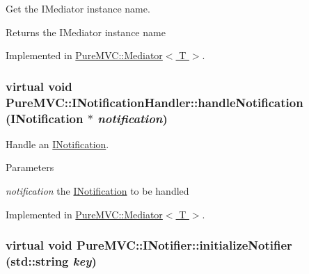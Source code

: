 Get the {\ttfamily IMediator} instance name. \begin{DoxyReturn}{Returns}
the {\ttfamily IMediator} instance name 
\end{DoxyReturn}


Implemented in \hyperlink{class_pure_m_v_c_1_1_mediator_aa199b499fc1cfae9b49b8336679787a8}{PureMVC::Mediator$<$ T $>$}.\hypertarget{class_pure_m_v_c_1_1_i_notification_handler_af31efbe0929caff0ac371bf45d3e9c50}{
\subsubsection[{handleNotification}]{\setlength{\rightskip}{0pt plus 5cm}virtual void PureMVC::INotificationHandler::handleNotification ({\bf INotification} $\ast$ {\em notification})}}
\label{class_pure_m_v_c_1_1_i_notification_handler_af31efbe0929caff0ac371bf45d3e9c50}


Handle an {\ttfamily \hyperlink{class_pure_m_v_c_1_1_i_notification}{INotification}}. 
\begin{DoxyParams}{Parameters}
\item[{\em notification}]the {\ttfamily \hyperlink{class_pure_m_v_c_1_1_i_notification}{INotification}} to be handled \end{DoxyParams}


Implemented in \hyperlink{class_pure_m_v_c_1_1_mediator_a869785c4f70518e40eaae7395c5f1d48}{PureMVC::Mediator$<$ T $>$}.\hypertarget{class_pure_m_v_c_1_1_i_notifier_a28d7dbbe0726d4d52080546c5d79b232}{
\subsubsection[{initializeNotifier}]{\setlength{\rightskip}{0pt plus 5cm}virtual void PureMVC::INotifier::initializeNotifier (std::string {\em key})}}
\label{class_pure_m_v_c_1_1_i_notifier_a28d7dbbe0726d4d52080546c5d79b232}


